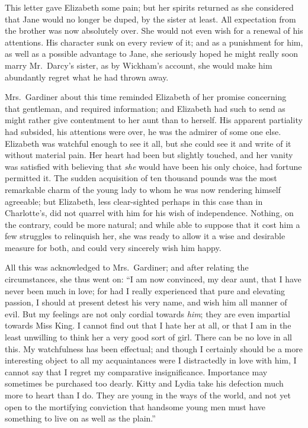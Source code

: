 \documentclass[12pt,english]{book}
\begin{document}
This letter gave Elizabeth some pain; but her spirits returned as
she considered that Jane would no longer be duped, by the sister at
least. All expectation from the brother was now absolutely over. She
would not even wish for a renewal of his attentions. His character
sunk on every review of it; and as a punishment for him, as well as
a possible advantage to Jane, she seriously hoped he might really
soon marry Mr.\ Darcy's sister, as by Wickham's account, she would
make him abundantly regret what he had thrown away.

Mrs.\ Gardiner about this time reminded Elizabeth of her promise
concerning that gentleman, and required information; and Elizabeth
had such to send as might rather give contentment to her aunt than
to herself. His apparent partiality had subsided, his attentions were
over, he was the admirer of some one else. Elizabeth was watchful
enough to see it all, but she could see it and write of it without
material pain. Her heart had been but slightly touched, and her vanity
was satisfied with believing that \textit{she} would have been his
only choice, had fortune permitted it. The sudden acquisition of ten
thousand pounds was the most remarkable charm of the young lady to
whom he was now rendering himself agreeable; but Elizabeth, less clear-sighted
perhaps in this case than in Charlotte's, did not quarrel with him
for his wish of independence. Nothing, on the contrary, could be more
natural; and while able to suppose that it cost him a few struggles
to relinquish her, she was ready to allow it a wise and desirable
measure for both, and could very sincerely wish him happy.

All this was acknowledged to Mrs.\ Gardiner; and after relating the
circumstances, she thus went on: {}``I am now convinced, my dear
aunt, that I have never been much in love; for had I really experienced
that pure and elevating passion, I should at present detest his very
name, and wish him all manner of evil. But my feelings are not only
cordial towards \textit{him}; they are even impartial towards Miss
King. I cannot find out that I hate her at all, or that I am in the
least unwilling to think her a very good sort of girl. There can be
no love in all this. My watchfulness has been effectual; and though
I certainly should be a more interesting object to all my acquaintances
were I distractedly in love with him, I cannot say that I regret my
comparative insignificance. Importance may sometimes be purchased
too dearly. Kitty and Lydia take his defection much more to heart
than I do. They are young in the ways of the world, and not yet open
to the mortifying conviction that handsome young men must have something
to live on as well as the plain.''
\end{document}
